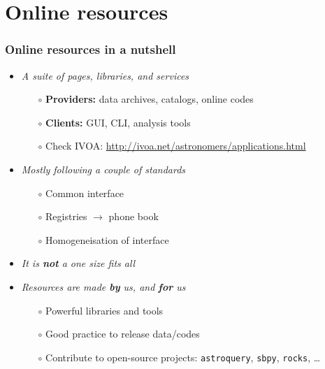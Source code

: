 \section{Online resources}

\begin{frame}
  \frametitle{Online resources in a nutshell}

  \begin{itemize}[<+->]
    \item \emph{A suite of pages, libraries, and services}
      \begin{itemize}[<.->]
        \item[$\circ$] \textbf{Providers:} data archives, catalogs, online codes
        \item[$\circ$] \textbf{Clients:} GUI, CLI, analysis tools
        \item[$\circ$] Check IVOA: \url{http://ivoa.net/astronomers/applications.html}
      \end{itemize}

    \vspace{1em}
    \item \emph{Mostly following a couple of standards}
      \begin{itemize}[<.->]
        \item[$\circ$] Common interface 
        \item[$\circ$] Registries $\rightarrow$ phone book
        \item[$\circ$] Homogeneisation of interface 
      \end{itemize}

    \vspace{1em}
    \item \emph{It is \textbf{not} a one size fits all}

    \vspace{1em}
    \item \emph{Resources are made \textbf{by} us, and \textbf{for} us}
      \begin{itemize}[<.->]
        \item[$\circ$] Powerful libraries and tools
        \item[$\circ$] Good practice to release data/codes 
        \item[$\circ$] Contribute to open-source projects: \texttt{astroquery}, \texttt{sbpy}, \texttt{rocks}, \dots
      \end{itemize}

  \end{itemize}

\end{frame}
